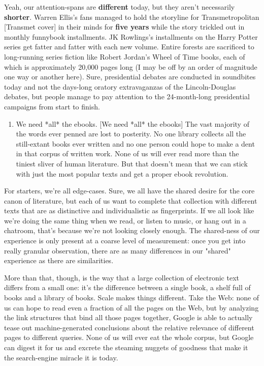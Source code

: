 Yeah, our attention-spans are \textbf{different} today, but they
aren't necessarily \textbf{shorter}. Warren Ellis's fans managed to
hold the storyline for Transmetropolitan [Transmet cover] in their
minds for \textbf{five years} while the story trickled out in
monthly funnybook installments. JK Rowlings's installments on the
Harry Potter series get fatter and fatter with each new volume.
Entire forests are sacrificed to long-running series fiction like
Robert Jordan's Wheel of Time books, each of which is approximately
20,000 pages long (I may be off by an order of magnitude one way or
another here). Sure, presidential debates are conducted in
soundbites today and not the days-long oratory extravaganzas of the
Lincoln-Douglas debates, but people manage to pay attention to the
24-month-long presidential campaigns from start to finish.

\begin{enumerate}
\item
  We need *all* the ebooks. [We need *all* the ebooks] The vast
  majority of the words ever penned are lost to posterity. No one
  library collects all the still-extant books ever written and no one
  person could hope to make a dent in that corpus of written work.
  None of us will ever read more than the tiniest sliver of human
  literature. But that doesn't mean that we can stick with just the
  most popular texts and get a proper ebook revolution.
\end{enumerate}
For starters, we're all edge-cases. Sure, we all have the shared
desire for the core canon of literature, but each of us want to
complete that collection with different texts that are as
distinctive and individualistic as fingerprints. If we all look
like we're doing the same thing when we read, or listen to music,
or hang out in a chatroom, that's because we're not looking closely
enough. The shared-ness of our experience is only present at a
coarse level of measurement: once you get into really granular
observation, there are as many differences in our "shared"
experience as there are similarities.

More than that, though, is the way that a large collection of
electronic text differs from a small one: it's the difference
between a single book, a shelf full of books and a library of
books. Scale makes things different. Take the Web: none of us can
hope to read even a fraction of all the pages on the Web, but by
analyzing the link structures that bind all those pages together,
Google is able to actually tease out machine-generated conclusions
about the relative relevance of different pages to different
queries. None of us will ever eat the whole corpus, but Google can
digest it for us and excrete the steaming nuggets of goodness that
make it the search-engine miracle it is today.

